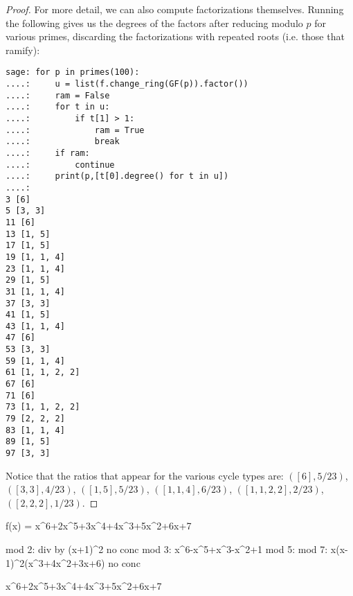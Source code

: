 \begin{proof}
	For more detail, we can also compute factorizations themselves. Running the following gives us the degrees of the factors after reducing modulo $p$ for various primes, discarding the factorizations with repeated roots (i.e. those that ramify):
	\begin{verbatim}
sage: for p in primes(100):
....:     u = list(f.change_ring(GF(p)).factor())
....:     ram = False
....:     for t in u:
....:         if t[1] > 1:
....:             ram = True
....:             break
....:     if ram:
....:         continue
....:     print(p,[t[0].degree() for t in u])
....:     
3 [6]
5 [3, 3]
11 [6]
13 [1, 5]
17 [1, 5]
19 [1, 1, 4]
23 [1, 1, 4]
29 [1, 5]
31 [1, 1, 4]
37 [3, 3]
41 [1, 5]
43 [1, 1, 4]
47 [6]
53 [3, 3]
59 [1, 1, 4]
61 [1, 1, 2, 2]
67 [6]
71 [6]
73 [1, 1, 2, 2]
79 [2, 2, 2]
83 [1, 1, 4]
89 [1, 5]
97 [3, 3]
	\end{verbatim}
	Notice that the ratios that appear for the various cycle types are: $([6], 5/23)$, $([3,3], 4/23)$, $([1,5], 5/23)$, $([1,1,4], 6/23)$, $([1,1,2,2], 2/23)$, $([2,2,2], 1/23)$.
\end{proof}

f(x) = x^6+2x^5+3x^4+4x^3+5x^2+6x+7


mod 2: div by (x+1)^2			no conc
mod 3: x^6-x^5+x^3-x^2+1		
mod 5: 
mod 7: x(x-1)^2(x^3+4x^2+3x+6)	no conc

x^6+2x^5+3x^4+4x^3+5x^2+6x+7




